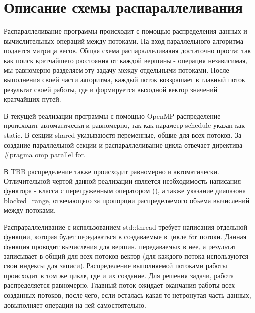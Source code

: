 \documentclass{report}
\begin{document}
\section*{Описание схемы распараллеливания}
\par Распараллеливание программы происходит с помощью распределения данных и вычислительных операций между потоками. На вход параллельного алгоритма подается матрица весов. Общая схема распараллеливания достаточно проста: так как поиск кратчайшего расстояния от каждой вершины - операция независимая, мы равномерно разделяем эту задачу между отдельными потоками. После выполнения своей части алгоритма, каждый поток возврашает в главный поток результат своей работы, где и формируется выходной вектор значений кратчайших путей. 
\par В текущей реализации программы с помощью OpenMP распределение происходит автоматически и равномерно, так как параметр schedule указан как static. В секции shared указываюстя переменные, общие для всех потоков. За создание параллельной секции и распараллеливание цикла отвечает директива \#pragma omp parallel for.
\par В TBB распределение также происходит равномерно и автоматически. Отличительной чертой данной реализации является необходимость написания функтора - класса с перегруженным оператором (), а также указание диапазона blocked\_range, отвечающего за пропорции распределяемого объема вычислений между потоками.
\par Распрараллеливание с использованием std::thread требует написания отдельной функции, которая будет передаваться в создаваемые в цикле for потоки. Данная функция проводит вычисления для вершин, передаваемых в нее, а результат записывает в общий для всех потоков вектор (для каждого потока используются свои индексы для записи). Распределение выполняемой потоками работы происходит в том же цикле, где и их создание. Для решения задачи, работа распределяется равномерно. Главный поток ожидает оканчания работы всех созданных потоков, после чего, если осталась какая-то нетронутая часть данных, довыполняет операции на ней самостоятельно. 
\newpage

\end{document}
